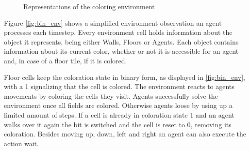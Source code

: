 \begin{figure}[hpbt]
    \centering
    \hspace{0.01\textwidth}
    \caption[Coloring Environment]{Representations of the coloring environment}
    \label{fig:multipic_env} %
\end{figure}

Figure \ref{fig:bin_env} shows a simplified environment observation an agent processes each timestep. Every environment cell holds information about the object it represents, being either Walls, Floors or Agents. Each object contains information about its current color, whether or not it is accessible for an agent and, in case of a floor tile, if it is colored.

Floor cells keep the coloration state in binary form, as displayed in \ref{fig:bin_env}, with a 1 signalizing that the cell is colored. The environment reacts to agents movements by coloring the cells they visit. Agents successfully solve the environment once all fields are colored. Otherwise agents loose by using up a limited amount of steps. If a cell is already in coloration state 1 and an agent walks over it again the bit is switched and the cell is reset to 0, removing its coloration. Besides moving up, down, left and right an agent can also execute the action wait.

